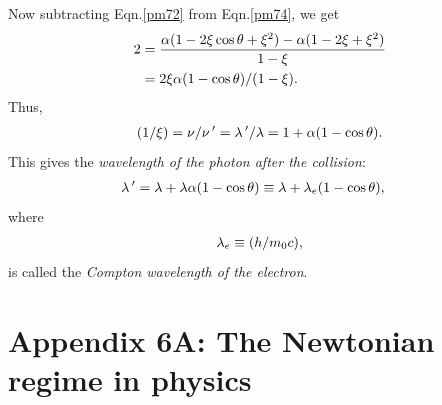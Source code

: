 Now subtracting Eqn.\eqref{pm72} from Eqn.\eqref{pm74}, 
we 
get\\
\vspace*{-1\bsk}\begin{align*}
 2&=\frac{{\alpha}(1-2\xi\cos\theta+\xi^2)
-{\alpha}(1-2\xi+\xi^2)}{1-\xi}\\ &=
2\xi{\alpha}(1-\cos\theta)/(1-\xi).
\end{align*}
Thus,
\begin{align}\label{pm75}
(1/\xi)=\nu/\nu\,'={\lambda}\,'/{\lambda}=1+{\alpha}(1-\cos\theta).
\end{align}
This gives the \textsl{wavelength of the photon after 
the 
collision}:
\begin{align}\label{pm76}
 {\lambda}\,'&={\lambda}+{\lambda}{\alpha}(1-\cos\theta)
\equiv {\lambda}+{\lambda}_e (1-\cos\theta),
\end{align}
where
\begin{align}\label{pm77}
{\lambda}_e\equiv  (h/m_ 0c),
\end{align}
is called the \textsl{Compton wavelength of the 
electron}.

\section{Appendix 6A: The Newtonian regime in physics}


